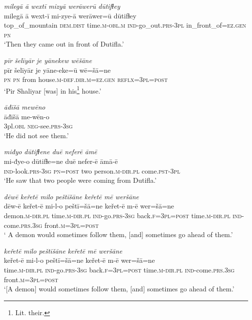\ea \label{ŽP.187}
\textit{milegā ā wextī mizyā werāwerū dūtifɫey} \\ 
\gll milegā ā wext-ī mi-zye-ā werāwer=ū dūtifɫey \\ 
 top\_of\_mountain \textsc{dem.dist} time\textsc{.m}\textsc{-obl}\textsc{.m} \textsc{ind-}go\_out\textsc{.prs}\textsc{-3pl} in\_front\_of\textsc{\textsc{=ez.gen}} \textsc{pn} \\ 
\glt `Then they came out in front of  Dutifla.'
\z 
 
\ea \label{ŽP.188}
\textit{pīr šelīyār je yānekew wēšāne} \\ 
\gll pīr šelīyār je yāne-eke=ū wē=šā=ne \\ 
 \textsc{pn} \textsc{pn} from house\textsc{.m}\textsc{-def}\textsc{.dir}\textsc{.m}\textsc{\textsc{=ez.gen}} \textsc{reflx}\textsc{=3pl}\textsc{=\textsc{post}} \\ 
\glt `Pir Shaliyar [was] in his\footnote{Lit. their.} house.'
\z 
 
\ea \label{ŽP.190}
\textit{āđīšā mewēno} \\ 
\gll āđīšā me-wēn-o \\ 
 3pl\textsc{.obl} \textsc{neg-}see\textsc{.prs}\textsc{-3sg} \\ 
\glt `He did not see them.'
\z 
 
\ea \label{ŽP.191}
\textit{miđyo dūtifɫene duē neferē āmē} \\ 
\gll mi-đye-o dūtifɫe=ne duē nefer-ē āmā-ē \\ 
 \textsc{ind-}look\textsc{.prs}\textsc{-3sg} \textsc{pn}\textsc{=\textsc{post}} two person\textsc{.m}\textsc{-dir}\textsc{.pl} come\textsc{.pst}\textsc{-3pl} \\ 
\glt `He saw that two people were coming from Dutifla.'
\z 
 
\ea \label{ŽP.192}
\textit{dēwē keřetē milo peštīšāne keřetē mē weršāne} \\ 
\gll dēw-ē keřet-ē mi-l-o peštī=šā=ne keřet-ē m-ē wer=šā=ne \\ 
 demon\textsc{.m}\textsc{-dir}\textsc{.pl} time\textsc{.m}\textsc{-dir}\textsc{.pl} \textsc{ind-}go\textsc{.prs}\textsc{-3sg} back\textsc{.f}\textsc{=3pl}\textsc{=\textsc{post}} time\textsc{.m}\textsc{-dir}\textsc{.pl} \textsc{ind-}come\textsc{.prs}\textsc{.3sg} front\textsc{.m}\textsc{=3pl}\textsc{=\textsc{post}} \\ 
\glt ` A demon would sometimes follow them, [and] sometimes go ahead of them.'
\z 
 
\ea \label{ŽP.193}
\textit{keřetē milo peštīšāne keřetē mē weršāne} \\ 
\gll keřet-ē mi-l-o peštī=šā=ne keřet-ē m-ē wer=šā=ne \\ 
 time\textsc{.m}\textsc{-dir}\textsc{.pl} \textsc{ind-}go\textsc{.prs}\textsc{-3sg} back\textsc{.f}\textsc{=3pl}\textsc{=\textsc{post}} time\textsc{.m}\textsc{-dir}\textsc{.pl} \textsc{ind-}come\textsc{.prs}\textsc{.3sg} front\textsc{.m}\textsc{=3pl}\textsc{=\textsc{post}} \\ 
\glt `[A demon] would sometimes follow them, [and] sometimes go ahead of them.'
\z 
 
